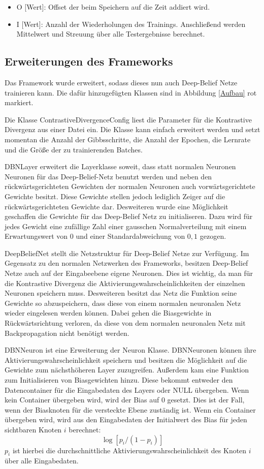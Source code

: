 \documentclass[12pt]{article}
\begin{document}
\begin{itemize}
\item O [Wert]:	Offset der beim Speichern auf die Zeit addiert wird.
\item I [Wert]: Anzahl der Wiederholungen des Trainings. Anschließend werden Mittelwert und Streuung über alle Testergebnisse berechnet.
\end{itemize}

\subsection{Erweiterungen des Frameworks}
Das Framework wurde erweitert, sodass dieses nun auch Deep-Belief Netze trainieren kann. Die dafür hinzugefügten Klassen sind in Abbildung \ref{Aufbau} rot markiert.

Die Klasse ContrastiveDivergenceConfig liest die Parameter für die Kontrastive Divergenz aus einer Datei ein. Die Klasse kann einfach erweitert werden und setzt momentan die Anzahl der Gibbsschritte, die Anzahl der Epochen, die Lernrate und die Größe der zu trainierenden Batches.

DBNLayer erweitert die Layerklasse soweit, dass statt normalen Neuronen Neuronen für das Deep-Belief-Netz benutzt werden und neben den rückwärtsgerichteten Gewichten der normalen Neuronen auch vorwärtsgerichtete Gewichte besitzt. Diese Gewichte stellen jedoch lediglich Zeiger auf die rückwärtsgerichteten Gewichte dar. Desweiteren wurde eine Möglichkeit geschaffen die Gewichte für das Deep-Belief Netz zu initialiseren. Dazu wird für jedes Gewicht eine zufällige Zahl einer gausschen Normalverteilung mit einem Erwartungswert von 0 und einer Standardabweichung von $0,1$ gezogen.

DeepBeliefNet stellt die Netzstruktur für Deep-Belief Netze zur Verfügung. Im Gegensatz zu den normalen Netzwerken des Frameworks, besitzen Deep-Belief Netze auch auf der Eingabeebene eigene Neuronen. Dies ist wichtig, da man für die Kontrastive Divergenz die Aktivierungswahrscheinlichkeiten der einzelnen Neuronen speichern muss. Desweiteren besitzt das Netz die Funktion seine Gewichte so abzuspeichern, dass diese von einem normalen neuronalen Netz wieder eingelesen werden können. Dabei gehen die Biasgewichte in Rückwärtsrichtung verloren, da diese von dem normalen neuronalen Netz mit Backpropagation nicht benötigt werden.

DBNNeuron ist eine Erweiterung der Neuron Klasse. DBNNeuronen können ihre Aktivierungswahrscheinlichkeit speichern und besitzen die Möglichkeit auf die Gewichte zum nächsthöheren Layer zuzugreifen. Außerdem kam eine Funktion zum Initialisieren von Biasgewichten hinzu. Diese bekommt entweder den Datencontainer für die Eingabedaten des Layers oder NULL übergeben. Wenn kein Container übergeben wird, wird der Bias auf 0 gesetzt. Dies ist der Fall, wenn der Biasknoten für die versteckte Ebene zuständig ist. Wenn ein Container übergeben wird, wird aus den Eingabedaten der Initialwert des Bias für jeden sichtbaren Knoten $i$ berechnet:
\begin{equation}
\log [p_i/(1-p_i)]
\end{equation}
$p_i$ ist hierbei die durchschnittliche Aktivierungswahrscheinlichkeit des Knoten $i$ über alle Eingabedaten.
\end{document}
